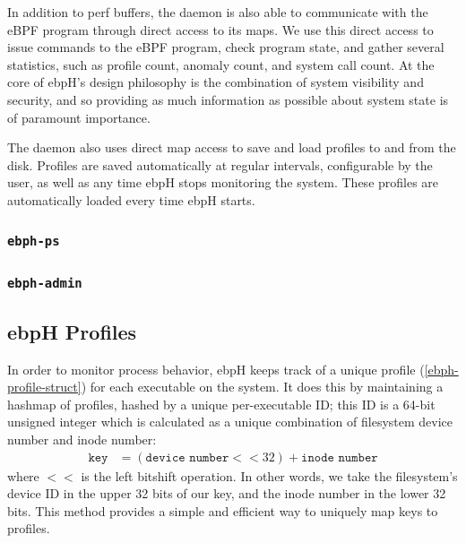 \documentclass[
  12pt]{findlay}
\begin{document}

In addition to perf buffers, the daemon is also able to communicate with
the eBPF program through direct access to its maps. We use this direct
access to issue commands to the eBPF program, check program state, and
gather several statistics, such as profile count, anomaly count, and
system call count. At the core of ebpH's design philosophy is the
combination of system visibility and security, and so providing as much
information as possible about system state is of paramount importance.

The daemon also uses direct map access to save and load profiles to and
from the disk. Profiles are saved automatically at regular intervals,
configurable by the user, as well as any time ebpH stops monitoring the
system. These profiles are automatically loaded every time ebpH starts.

\hypertarget{ebph-ps}{%
\subsubsection{\texorpdfstring{\texttt{ebph-ps}}{ebph-ps}}\label{ebph-ps}}

\hypertarget{ebph-admin}{%
\subsubsection{\texorpdfstring{\texttt{ebph-admin}}{ebph-admin}}\label{ebph-admin}}

\hypertarget{ebph-profiles}{%
\subsection{ebpH Profiles}\label{ebph-profiles}}

In order to monitor process behavior, ebpH keeps track of a unique
profile (\autoref{ebph-profile-struct}) for each executable on the
system. It does this by maintaining a hashmap of profiles, hashed by a
unique per-executable ID; this ID is a 64-bit unsigned integer which is
calculated as a unique combination of filesystem device number and inode
number: \begin{align*}
\texttt{key} &= (\texttt{device number} << 32) + \texttt{inode number}
\end{align*} where \(<<\) is the left bitshift operation. In other
words, we take the filesystem's device ID in the upper 32 bits of our
key, and the inode number in the lower 32 bits. This method provides a
simple and efficient way to uniquely map keys to profiles.
\end{document}
